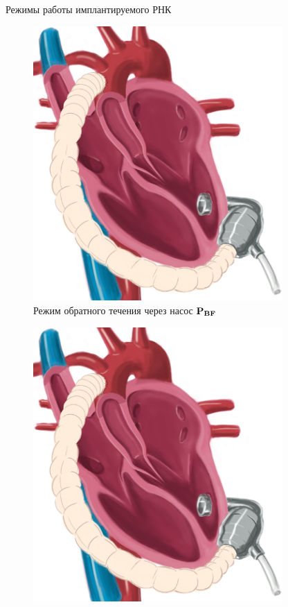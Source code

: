 \documentclass[a4paper, 9pt]{beamer}
\begin{document}
\begin{frame}{Режимы работы имплантируемого РНК}
\vskip10pt
\begin{minipage}[bht]{0.20\textwidth}
\begin{figure}
	\includegraphics[width=0.85\textwidth]{../images/heart_ps_pres}
	\caption*{\scriptsize Режим обратного течения через насос $\bf P_{BF}$}
\end{figure}
\end{minipage}
\hfill
\begin{minipage}[bht]{0.22\textwidth}
\begin{figure}
	\vskip5pt
	\includegraphics[width=0.85\textwidth]{../images/heart_ps_pres}

\end{figure}
\end{minipage}
\end{frame}
\end{document}
